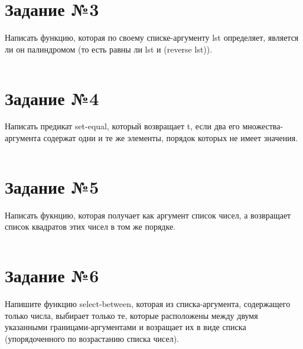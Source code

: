 \section{Задание №3}

Написать функцию, которая по своему списке-аргументу lst определяет, является
ли он палиндромом (то есть равны ли lst и (reverse lst)).

\vspace{4mm}
\begin{minipage}{0.92\linewidth}
\begin{lstlisting}
\end{lstlisting}
\end{minipage}

\section{Задание №4}

Написать предикат set-equal, который возвращает t, если два его
множества-аргумента содержат одни и те же элементы, порядок которых не имеет
значения.

\vspace{4mm}
\begin{minipage}{0.92\linewidth}
\begin{lstlisting}
\end{lstlisting}
\end{minipage}

\section{Задание №5}

Написать фукнцию, которая получает как аргумент список чисел, а возвращает
список квадратов этих чисел в том же порядке.

\vspace{4mm}
\begin{minipage}{0.92\linewidth}
\begin{lstlisting}
\end{lstlisting}
\end{minipage}

\section{Задание №6}

Напишите функцию select-between, которая из списка-аргумента, содержащего
только числа, выбирает только те, которые расположены между двумя указанными
границами-аргументами и возращает их в виде списка (упорядоченного по
возрастанию списка чисел).


